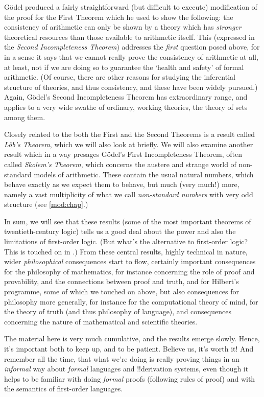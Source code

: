 G\"odel  produced a fairly straightforward (but difficult to execute)
modification of the proof  for the First Theorem which he used to show
the following: the consistency of arithmetic can only be shown by a
theory which has \emph{stronger} theoretical resources than those
available to arithmetic itself. This (expressed in the \emph{Second
Incompleteness Theorem}) addresses the \emph{first} question posed
above, for in a sense it says that we cannot really prove the
consistency of arithmetic at all, at least, not  if we are doing so to
guarantee the `health and safety' of formal arithmetic.  (Of course,
there are other reasons for studying the inferential structure of
theories, and thus consistency, and these have been widely pursued.)
Again, G\"odel's Second Incompleteness Theorem   has extraordinary
range, and applies to a very wide swathe of ordinary, working
theories, the theory of sets among them. 

Closely related to the both the First and the Second Theorems is a
result called \emph{L\"ob's Theorem}, which we will also look at
briefly. We will also examine another result which in a way presages
G\"odel's First Incompleteness Theorem, often called \emph{Skolem's
Theorem}, which concerns the austere and strange world of non-standard
models of arithmetic. These contain the usual natural numbers, which
behave exactly as we expect them to behave, but much (very much!{})
more,  namely a vast multiplicity of what we call \emph{non-standard
numbers} with very odd structure (see \cref{mod:chap}.) 

In sum, we will see that these results (some of the most important
theorems of  twentieth-century logic) tells us a good deal about the
power and also the limitations of first-order logic. (But what's the
alternative to first-order logic? This is touched on in
.) From  these central results, highly
technical in nature, wider \emph{philosophical} consequences start to
flow, certainly important consequences for the philosophy of
mathematics, for instance concerning  the role of proof and
provability, and the connections between proof and truth, and for
Hilbert's programme, some of which we touched on above, but also
consequences for philosophy more generally, for instance for the
computational theory of mind, for the theory of truth (and thus
philosophy of language), and consequences concerning the nature of
mathematical and scientific theories. 

\bigskip

\noindent The material here is very much cumulative, and the results
emerge slowly. Hence, it's important both to keep up, and to be
patient. Believe us, it's worth it!{} And remember all the time, that
what we're doing is really proving things in an \emph{informal} way
about \emph{formal} languages and !!{derivation} systems, even though it helps
to be familiar with doing \emph{formal} proofs (following rules of
proof) and with the semantics of first-order languages. 

